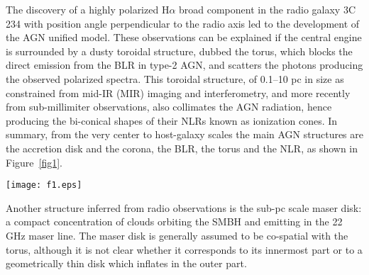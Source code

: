 \documentclass{natureprintstyle}
\begin{document}
{The discovery of a highly polarized H$\alpha$ broad component in the radio galaxy 3C\,234 with position angle perpendicular to the radio axis\cite{Antonucci84} led to the development of the AGN unified model\cite{Antonucci93,Urry95}. %
These observations can be explained if the central engine is surrounded by a dusty toroidal structure, dubbed the torus, which blocks the direct emission from the BLR in type-2 AGN, and scatters the photons producing the observed polarized spectra.} This toroidal structure, of 0.1--10 pc in size {as constrained from mid-IR (MIR) imaging\cite{Packham05,Radomski08} and interferometry\cite{Burtscher13}, and more recently from sub-millimiter observations\cite{Imanishi16,Garcia16,Gallimore16}}, also collimates the AGN radiation, hence producing the bi-conical shapes of their NLRs known as ionization cones\cite{Malkan98}. 
In summary, from the very center to host-galaxy scales the main AGN structures are the accretion disk and the corona, the BLR, the torus and the NLR, as shown in Figure~\ref{fig1}.


\begin{figure*}
\centering
\texttt{[image: f1.eps]}
\caption{Sketch of the main AGN structures seen along the equatorial and polar direction. From the center to host-galaxy scales:
SMBH, accretion disk and corona, BLR, torus and NLR. Different colours indicate different compositions or
densities.}
\label{fig1}
\end{figure*}




{Another structure inferred from radio observations is the sub-pc scale maser disk: a compact concentration of clouds orbiting the SMBH and emitting in the 22 GHz maser line\cite{Greenhill96}. The maser disk is generally assumed to be co-spatial with the torus, although it is not clear whether it corresponds to its innermost part or to a geometrically thin disk which inflates in the outer part\cite{Masini16}. %
}  
\end{document}
